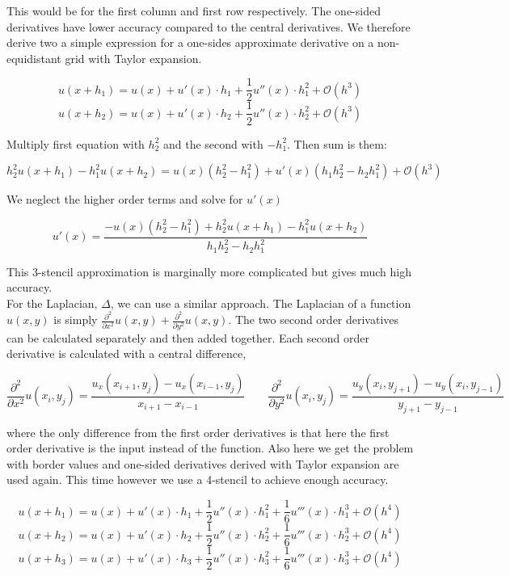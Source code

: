 \documentclass[paper=a4, fontsize=12pt]{article} %
\begin{document}
This would be for the first column and first row respectively. The one-sided derivatives have lower accuracy compared to the central derivatives. We therefore derive two a simple expression for a one-sides approximate derivative on a non-equidistant grid with Taylor expansion.


$$u(x+h_1) = u(x) + u'(x)\cdot h_1 + \frac{1}{2}u''(x)\cdot h_1^2 + \mathcal{O}(h^3)$$
$$u(x+h_2) = u(x) + u'(x)\cdot h_2 + \frac{1}{2}u''(x)\cdot h_2^2 + \mathcal{O}(h^3)$$

Multiply first equation with $h_2^2$ and the second with $-h_1^2$. Then sum is them:

$$ h_2^2 u(x+h_1)  - h_1^2 u(x+h_2)  = u(x) (h_2^2 - h_1^2 ) + u'(x) (h_1 h_2^2 - h_2 h_ 1^2) +  \mathcal{O}(h^3) $$

We neglect the higher order terms and solve for $u'(x)$

$$  u'(x) = \frac{- u(x) (h_2^2 - h_1^2 ) + h_2^2 u(x+h_1)  - h_1^2 u(x+h_2) }{h_1 h_2^2 - h_2 h_ 1^2}  $$

This 3-stencil approximation is marginally more complicated but gives much high accuracy. \\


For the Laplacian, $\Delta$, we can use a similar approach. The Laplacian of a function $u(x,y) $ is simply $\frac{\partial^2}{\partial x^2} u(x,y) + \frac{\partial^2}{\partial y^2} u(x,y) $. The two second order derivatives can be calculated separately and then added together. Each second order derivative is calculated with a central difference,

$$ \frac{\partial^2}{\partial x^2} u(x_i,y_j)  = \frac{u_x(x_{i+1},y_j)-u_x(x_{i-1},y_j)}{x_{i+1} - x_{i-1}} \qquad  \frac{\partial^2}{\partial y^2} u(x_i,y_j)  = \frac{u_y(x_{i},y_{j+1})-u_y(x_{i},y_{j-1})}{y_{j+1} - y_{j-1}}$$

where the only difference from the first order derivatives is that here the first order derivative is the input instead of the function. Also here we get the problem with border values and one-sided derivatives derived with Taylor expansion are used again. This time however we use a 4-stencil to achieve enough accuracy.

$$u(x+h_1) = u(x) + u'(x)\cdot h_1 + \frac{1}{2}u''(x)\cdot h_1^2 + \frac{1}{6}u'''(x)\cdot h_1^3 + \mathcal{O}(h^4)$$
$$u(x+h_2) = u(x) + u'(x)\cdot h_2 + \frac{1}{2}u''(x)\cdot h_2^2 + \frac{1}{6}u'''(x)\cdot h_2^3 + \mathcal{O}(h^4)$$
$$u(x+h_3) = u(x) + u'(x)\cdot h_3 + \frac{1}{2}u''(x)\cdot h_3^2 + \frac{1}{6}u'''(x)\cdot h_3^3 + \mathcal{O}(h^4)$$
\end{document}
